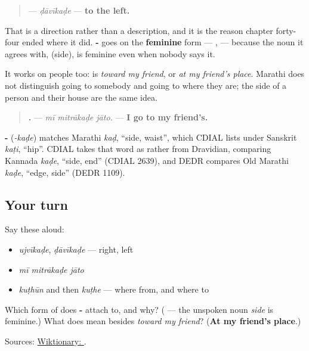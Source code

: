 \begin{quote}
\textbf{} — \emph{ḍāvīkaḍe} — \textbf{to the left.}
\end{quote}

That is a direction rather than a description, and it is the reason chapter forty-four ended where it did. \textbf{-} goes on the \textbf{feminine} form — \textbf{}, \textbf{} — because the noun it agrees with, \emph{} (side), is feminine even when nobody says it.

It works on people too: \textbf{} is \emph{toward my friend}, or \emph{at my friend's place}. Marathi does not distinguish going to somebody and going to where they are; the side of a person and their house are the same idea.

\begin{quote}
\textbf{  .} — \emph{mī mitrākaḍe jāto.} — \textbf{I go to my friend's.}
\end{quote}

\begin{cousinweb}
\textbf{-} (\emph{-kaḍe}) matches Marathi \emph{kaḍ}, \textquotedblleft{}side, waist\textquotedblright{}, which CDIAL lists under Sanskrit \emph{kaṭi}, \textquotedblleft{}hip\textquotedblright{}. CDIAL takes that word as rather from Dravidian, comparing Kannada \emph{kaḍe}, \textquotedblleft{}side, end\textquotedblright{} (CDIAL 2639), and DEDR compares Old Marathi \emph{kaḍe}, \textquotedblleft{}edge, side\textquotedblright{} (DEDR 1109).
\end{cousinweb}

\subsection*{Your turn}
Say these aloud:

\begin{itemize}
\raggedright
  \item \emph{ujvīkaḍe}, \emph{ḍāvīkaḍe} — right, left
  \item \emph{mī mitrākaḍe jāto}
  \item \emph{kuṭhūn} and then \emph{kuṭhe} — where from, and where to
\end{itemize}

\begin{tcolorbox}[breakable,colback=teal!4,colframe=teal!35!black,title={Before you move on}]
Which form of \textbf{} does \textbf{-} attach to, and why? (\textbf{} — the unspoken noun \emph{side} is feminine.) What does \textbf{} mean besides \emph{toward my friend}? (\textbf{At my friend's place}.)

Sources: \href{https://en.wiktionary.org/wiki/\%E0\%A4\%95\%E0\%A4\%A1\%E0\%A5\%87}{Wiktionary: }.
\end{tcolorbox}
